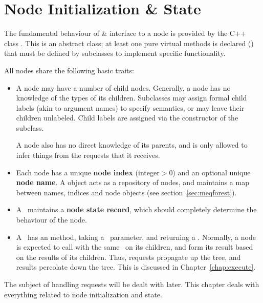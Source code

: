 \chapter{Node Initialization \& State}

  The fundamental behaviour of \& interface to a node is provided by the C++
  class . This is an abstract class; at least one pure virtual
  methods is declared () that must be defined by
  subclasses to implement specific functionality.

  All nodes share the following basic traits:

  \begin{itemize}

  \item A node may have a number of child nodes. Generally, a node has no
    knowledge of the types of its children. Subclasses may assign formal child
    labels (akin to argument names) to specify semantics, or may leave their
    children unlabeled. Child labels are assigned via the constructor of the
    subclass.
    
    A node also has no direct knowledge of its parents, and is only allowed to
    infer things from the requests that it receives.

  \item Each node has a unique {\bf node index} (integer$>$0) and an optional
    unique {\bf node name}. A  object acts as a repository of
    nodes, and maintains a map between names, indices and node objects (see
    section~\ref{sec:meqforest}).

  \item A \Node\ maintains a {\bf node state record}, which should completely
    determine the behaviour of the node. 
    
  \item A \Node\ has an  method, taking a \Request\ parameter,
    and returning a \Result. Normally, a node is expected to call
     with the same \Request\ on its children, and form its result
    based on the results of its children. Thus, requests propagate up the tree,
    and results percolate down the tree. This is discussed in
    Chapter~\ref{chap:execute}. 

  \end{itemize}
  
  The subject of handling requests will be dealt with later. This chapter deals
  with everything related to node initialization and state.
  
